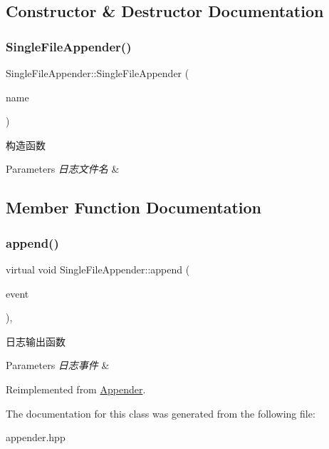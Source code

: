 \subsection{Constructor \& Destructor Documentation}
\mbox{\label{classSingleFileAppender_a2bebe6f26c13faa8da336bfdd420de34}} 
\subsubsection{\texorpdfstring{Single\+File\+Appender()}{SingleFileAppender()}}
{\footnotesize\ttfamily Single\+File\+Appender\+::\+Single\+File\+Appender (\begin{DoxyParamCaption}\item[{const std\+::string \&}]{name }\end{DoxyParamCaption})}



构造函数 


\begin{DoxyParams}{Parameters}
{\em 日志文件名} & \\
\hline
\end{DoxyParams}


\subsection{Member Function Documentation}
\mbox{\label{classSingleFileAppender_a704503dbaa2cf1ec75ccc08e2bd26c76}} 
\subsubsection{\texorpdfstring{append()}{append()}}
{\footnotesize\ttfamily virtual void Single\+File\+Appender\+::append (\begin{DoxyParamCaption}\item[{Log\+Event\+::sptr}]{event }\end{DoxyParamCaption})\hspace{0.3cm}{\ttfamily [override]}, {\ttfamily [virtual]}}



日志输出函数 


\begin{DoxyParams}{Parameters}
{\em 日志事件} & \\
\hline
\end{DoxyParams}


Reimplemented from \hyperlink{classAppender_a3bfa17781e5b6102667725a5d23b394a}{Appender}.



The documentation for this class was generated from the following file\+:\begin{DoxyCompactItemize}
\item 
appender.\+hpp\end{DoxyCompactItemize}
